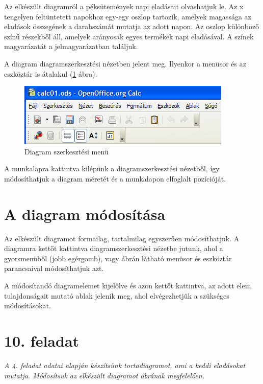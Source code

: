Az elkészült diagramról a péksütemények napi eladásait
olvashatjuk le. Az x tengelyen feltüntetett  napokhoz egy-egy oszlop
tartozik, amelyek magassága az eladások összegének a
darabszámát mutatja az adott napon. Az oszlop különböző
színű részekből áll, amelyek arányosak egyes termékek
napi eladásával. A színek magyarázatát a jelmagyarázatban
találjuk.

A diagram diagramszerkesztési nézetben jelent meg. Ilyenkor a
menüsor és az eszköztár is átalakul (\ref{DiagramSzerkesztés} ábra).

\begin{figure}[!h]
\begin{center}
\includegraphics[width=10.211cm]{oocalcv1-img58.png}
\caption{Diagram szerkesztési menü}\label{DiagramSzerkesztés}
\end{center}
\end{figure}

A munkalapra kattintva kilépünk a diagramszerkesztési
nézetből, így módosíthatjuk a diagram  méretét és a
munkalapon elfoglalt pozícióját. 


\section{A diagram módosítása}

Az elkészült diagramot formailag, tartalmilag egyszerűen
módosíthatjuk. A diagramra kettőt kattintva
diagramszerkesztési nézetbe jutunk, ahol a gyorsmenüből (jobb
egérgomb), vagy  ábrán látható menüsor és
eszköztár parancsaival módosíthatjuk azt.

A módosítandó diagramelemet kijelölve és azon kettőt
kattintva, az adott elem tulajdonságait mutató ablak jelenik meg,
ahol elvégezhetjük a szükséges módosításokat.


\section{10. feladat}
{\itshape
A 4. feladat adatai alapján készítsünk tortadiagramot, ami a
keddi eladásokat mutatja. Módosítsuk az elkészült diagramot
 ábrának megfelelően.}

